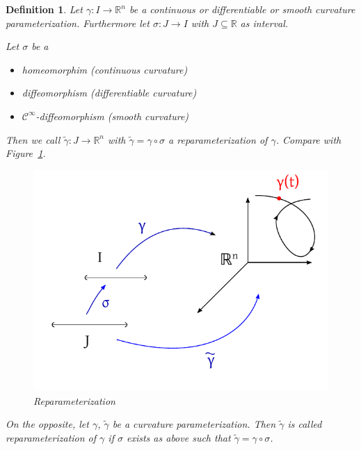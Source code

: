 \documentclass{article}
\newtheorem{definition}{Definition}  \numberwithin{definition}{section}
\begin{document}
\begin{definition} %
  Let $\gamma: I \to \mathbb R^n$ be a continuous or differentiable or smooth curvature parameterization.
  Furthermore let $\sigma: J \to I$ with $J \subseteq \mathbb R$ as interval.

  Let $\sigma$ be a
  \begin{itemize}
    \item homeomorphim (continuous curvature)
    \item diffeomorphism (differentiable curvature)
    \item $\mathcal C^\infty$-diffeomorphism (smooth curvature)
  \end{itemize}
  Then we call $\tilde \gamma: J \to \mathbb R^n$ with $\tilde \gamma = \gamma \circ \sigma$ a \emph{reparameterization} of $\gamma$.
  Compare with Figure~\ref{img:reparam}.

  \begin{figure}[t]
    \begin{center}
      \includegraphics{img/40_reparameterization.pdf} %
      \caption{Reparameterization}
      \label{img:reparam}
    \end{center}
  \end{figure}

  On the opposite, let $\gamma$, $\tilde \gamma$ be a curvature parameterization. Then $\tilde\gamma$ is called reparameterization of $\gamma$ if $\sigma$ exists as above such that $\tilde \gamma = \gamma \circ \sigma$.
\end{definition}
\end{document}
